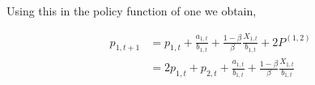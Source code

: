 Using this in the policy function of one we obtain,

\begin{equation*}
    \begin{split}
        p_{1, t+1} &= p_{1, t} + \frac{a_{1, t}}{b_{1, t}} + \frac{1 - \beta}{\beta} \frac{X_{1, t}}{b_{1, t}} + 2P^{(1, 2)} \\
        &= 2p_{1, t} + p_{2, t} + \frac{a_{1, t}}{b_{1, t}} + \frac{1 - \beta}{\beta} \frac{X_{1, t}}{b_{1, t}}
    \end{split}
\end{equation*}

\iffalse
    \begin{figure}[H]
        \begin{subfigure}{0.48\textwidth}
            \centering
            \texttt{[image: \\plotpath/two/pricesupply.pdf]}
            \caption{Price and supply in each node}
        \end{subfigure}
        \hfill
        \begin{subfigure}{0.48\textwidth}
            \centering
            \texttt{[image: \\plotpath/two/demand.pdf]}
            \caption{Excess demand, $X_{1, t}$ and $X_{2, t}$, and supply shortage, $X_{1, t} + X_{2, t}$.}
        \end{subfigure}
        \caption{A demand shock with two providers} \label{fig:two}
    \end{figure}

\fi